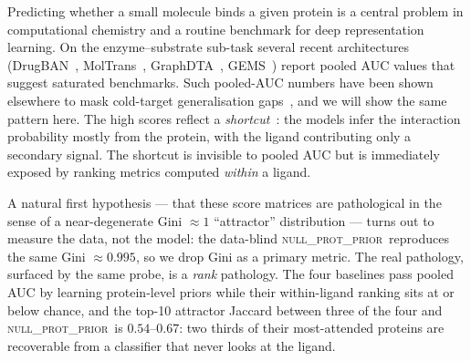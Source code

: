 \documentclass[11pt,a4paper]{article}
\newcommand{\nullprior}{\textsc{null\_prot\_prior}\xspace}
\begin{document}
Predicting whether a small molecule binds a given protein is a central
problem in computational chemistry and a routine benchmark for deep
representation learning. On the enzyme--substrate sub-task several
recent architectures (DrugBAN~\citep{bai2023drugban},
MolTrans~\citep{huang2021moltrans}, GraphDTA~\citep{nguyen2021graphdta},
GEMS~\citep{wang2023gems}) report pooled AUC values that suggest
saturated benchmarks. Such pooled-AUC numbers have been shown elsewhere
to mask cold-target generalisation
gaps~\citep{pahikkala2015,jiang2020dtigeneralisation}, and we will show
the same pattern here. The high scores reflect a
\emph{shortcut}~\citep{geirhos2020shortcut,kapoor2023leakage}: the
models infer the interaction probability mostly from the protein, with
the ligand contributing only a secondary signal. The shortcut is
invisible to pooled AUC but is immediately exposed by ranking metrics
computed \emph{within} a ligand.

A natural first hypothesis --- that these score matrices are pathological in
the sense of a near-degenerate Gini $\approx 1$ ``attractor'' distribution ---
turns out to measure the data, not the model: the data-blind \nullprior\
reproduces the same Gini $\approx 0.995$, so we drop Gini as a primary metric.
The real pathology, surfaced by the same probe, is a \emph{rank} pathology.
The four baselines pass pooled AUC by learning protein-level priors while
their within-ligand ranking sits at or below chance, and the top-10 attractor
Jaccard between three of the four and \nullprior\ is $0.54$--$0.67$: two thirds
of their most-attended proteins are recoverable from a classifier that never
looks at the ligand.
\end{document}
